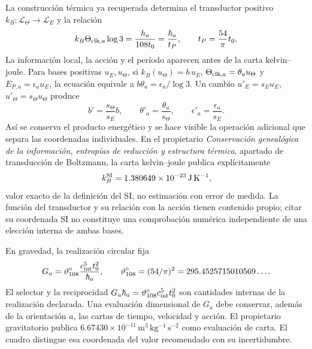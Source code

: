 La construcción térmica ya recuperada determina el transductor positivo
\(k_B:\mathcal L_\Theta\to\mathcal L_E\) y la relación
\begin{equation}
 k_B\Theta_{{\rm clk},a}\log3
 =\frac{h_a}{108t_0}=\frac{\hbar_a}{t_P},
 \qquad t_P=\frac{54}{\pi}t_0.
 \label{eq:ii-kb-comparacion}
\end{equation}
La información local, la acción y el período aparecen antes de la carta
kelvin--joule. Para bases positivas \(u_E,u_\Theta\), si
\(k_B(u_\Theta)=b\,u_E\),
\(\Theta_{{\rm clk},a}=\theta_a u_\Theta\) y
\(E_{P,a}=\epsilon_a u_E\), la ecuación equivale a
\(b\theta_a=\epsilon_a/\log3\). Un cambio
\(u'_E=s_Eu_E\), \(u'_\Theta=s_\Theta u_\Theta\) produce
\[
 b'=\frac{s_\Theta}{s_E}b,\qquad
 \theta'_a=\frac{\theta_a}{s_\Theta},\qquad
 \epsilon'_a=\frac{\epsilon_a}{s_E}.
\]
Así se conserva el producto energético y se hace visible la operación
adicional que separa las coordenadas individuales. En el propietario
\emph{Conservación genealógica de la información, entropías de reducción
y estructura térmica}, apartado de transducción de Boltzmann, la carta
kelvin--joule publica explícitamente
\[
 k_B^{\rm SI}=1.380649\times10^{-23}\,\mathrm{J\,K^{-1}},
\]
valor exacto de la definición del SI, no estimación con error de medida.
La función del transductor y su relación con la acción tienen contenido
propio; citar su coordenada SI no constituye una comprobación numérica
independiente de una elección interna de ambas bases.

En gravedad, la realización circular fija
\begin{equation}
 G_a=\vartheta_{108}^{\circ}\frac{c_{\rm int}^{5}t_0^2}{\hbar_a},
 \qquad
 \vartheta_{108}^{\circ}=(54/\pi)^2
 =295.4525715010569\ldots.
 \label{eq:ii-g-comparacion}
\end{equation}
El selector y la reciprocidad \(G_a\hbar_a=
\vartheta_{108}^{\circ}c_{\rm int}^{5}t_0^2\) son cantidades internas de
la realización declarada. Una evaluación dimensional de \(G_a\) debe
conservar, además de la orientación \(a\), las cartas de tiempo,
velocidad y acción. El propietario gravitatorio publica
\(6.67430\times10^{-11}\,\mathrm{m^3\,kg^{-1}\,s^{-2}}\)
como evaluación de carta. El cuadro distingue esa coordenada del
valor recomendado con su incertidumbre.

